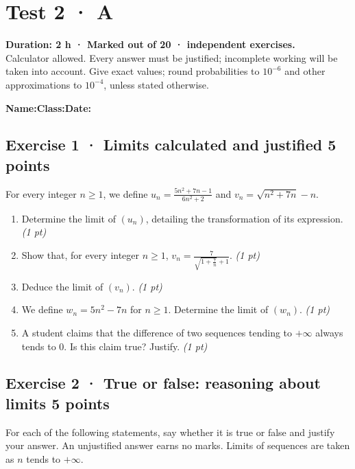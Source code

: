 \fi

\ifmxteacher

\mxnewpage{}\label{sujet:2-3}

\section*{Test 2 · A}


\textbf{Duration: 2 h · Marked out of 20 ·  independent exercises.}\\Calculator allowed. Every answer must be justified; incomplete working will be taken into account. Give exact values; round probabilities to $10^{-6}$ and other approximations to $10^{-4}$, unless stated otherwise.

\smallskip\textbf{Name:}\enspace\dotfill\quad\textbf{Class:}\enspace\dotfill\quad\textbf{Date:}\enspace\dotfill

\subsection*{Exercise 1 · Limits calculated and justified \hfill 5 points}For every integer $n\ge1$, we define $u_n=\frac{5n^2+7n-1}{6n^2+2}$ and $v_n=\sqrt{n^2+7n}-n$.

\begin{enumerate}

\item Determine the limit of $(u_n)$, detailing the transformation of its expression. \hfill\textit{(1 pt)}

\item Show that, for every integer $n\ge1$, $v_n=\frac{7}{\sqrt{1+\frac{7}n}+1}$. \hfill\textit{(1 pt)}

\item Deduce the limit of $(v_n)$. \hfill\textit{(1 pt)}

\item We define $w_n=5n^2-7n$ for $n\ge1$. Determine the limit of $(w_n)$. \hfill\textit{(1 pt)}

\item A student claims that the difference of two sequences tending to $+\infty$ always tends to $0$. Is this claim true? Justify. \hfill\textit{(1 pt)}

\end{enumerate}

\subsection*{Exercise 2 · True or false: reasoning about limits \hfill 5 points}For each of the following statements, say whether it is true or false and justify your answer. An unjustified answer earns no marks. Limits of sequences are taken as $n$ tends to $+\infty$.

